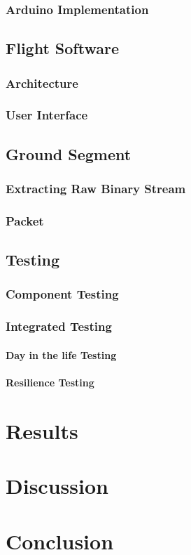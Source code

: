 \subsection{Arduino Implementation}

\section{Flight Software}
\label{sec:flight-software}

\subsection{Architecture}

\subsection{User Interface}

\section{Ground Segment}

\subsection{Extracting Raw Binary Stream}

\subsection{Packet}

\section{Testing}

\subsection{Component Testing}

\subsection{Integrated Testing}

\subsubsection{Day in the life Testing}

\subsubsection{Resilience Testing}

\newpage
\chapter{Results}
\label{ch:results}

\newpage
\chapter{Discussion}
\label{ch:discussion}

\newpage
\chapter{Conclusion}
\label{ch:conclusion}


\newpage
\printbibliography[heading=bibnumbered, title=References]  

